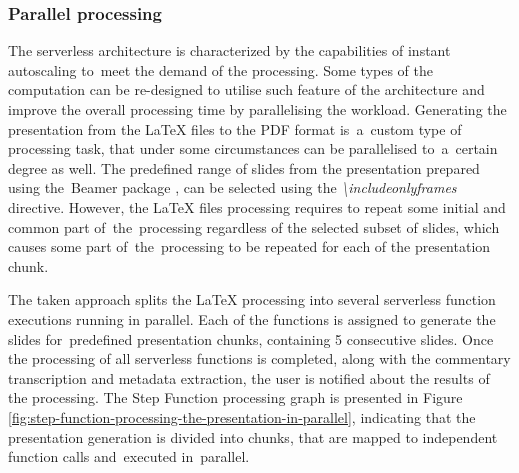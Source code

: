 \subsubsection{Parallel processing} \label{section:case-study-parallel-processing}

The serverless architecture is characterized by the capabilities of instant autoscaling to~meet the demand of the processing.
Some types of the computation can be re-designed to utilise such feature of the architecture and improve the overall processing time by parallelising the workload.
Generating the presentation from the LaTeX files to the PDF format is~a~custom type of processing task, that under some circumstances can be parallelised to~a~certain degree as well.
The predefined range of slides from the presentation prepared using the~Beamer package \cite{beamer}, can be selected using the \textit{\textbackslash includeonlyframes} directive.
However, the LaTeX files processing requires to repeat some initial and common part of~the~processing regardless of the selected subset of slides, which causes some part of~the~processing to be repeated for each of the presentation chunk.

The taken approach splits the LaTeX processing into several serverless function executions running in parallel. Each of the functions is assigned to generate the slides for~predefined presentation chunks, containing 5 consecutive slides. Once the processing of all serverless functions is completed, along with the commentary transcription and metadata extraction, the user is notified about the results of the processing. The Step Function processing graph is presented in Figure \ref{fig:step-function-processing-the-presentation-in-parallel}, indicating that the presentation generation is divided into chunks, that are mapped to independent function calls and~executed in~parallel.

\datasetSingleVsParallel

